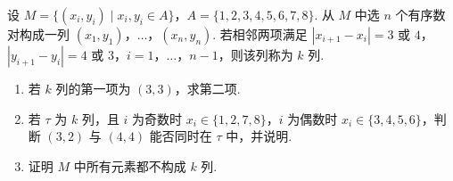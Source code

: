 \documentclass[UTF8,a4paper,oneside,11pt]{ctexbook}
\begin{document}
\begin{problem}
设 \(M=\{(x_i,y_i)\mid x_i,y_i\in A\}\)，\(A=\{1,2,3,4,5,6,7,8\}\). 从 \(M\) 中选 \(n\) 个有序数对构成一列 \((x_1,y_1)\)，\(\dots\)，\((x_n,y_n)\). 若相邻两项满足 \(|x_{i+1}-x_i|=3\text{\ 或\ }4\)，\(|y_{i+1}-y_i|=4\text{\ 或\ }3\)，\(i=1\)，\(\dots\)，\(n-1\)，则该列称为 \(k\) 列.

\begin{enumerate}
    \item 若 \(k\) 列的第一项为 \((3,3)\)，求第二项.
    \item 若 \(\tau\) 为 \(k\) 列，且 \(i\) 为奇数时 \(x_i\in\{1,2,7,8\}\)，\(i\) 为偶数时 \(x_i\in\{3,4,5,6\}\)，判断 \((3,2)\) 与 \((4,4)\) 能否同时在 \(\tau\) 中，并说明.
    \item 证明 \(M\) 中所有元素都不构成 \(k\) 列.
\end{enumerate}
\end{problem}
\end{document}
